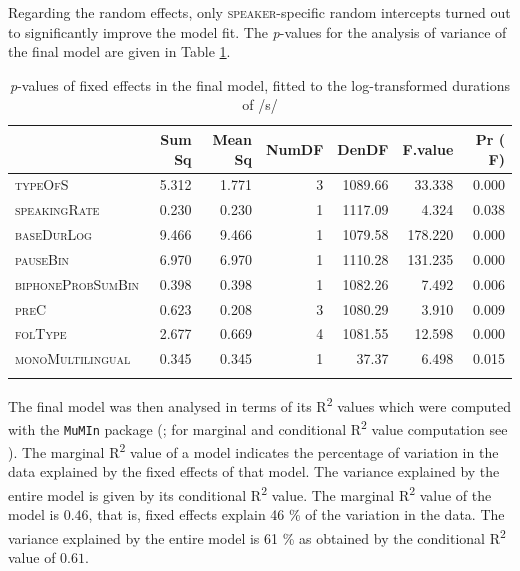 Regarding the random effects, only \textsc{speaker}-specific random intercepts turned out to significantly improve the model fit. The \textit{p}-values for the analysis of variance of the final model are given in Table \ref{tab:4.4}.

\begin{table}\fontsize{10}{11}
\caption{\textit{p}-values of fixed effects in the final model, fitted to the log-transformed durations of /s/}
\label{tab:4.4}
\centering
\begin{tabular}{lrrrrrr} 
\lsptoprule
~                 & Sum Sq & Mean Sq & NumDF & DenDF   & F.value & Pr ( F)  \\ 
\midrule
\textsc{typeOfS}           & 5.312  & 1.771   & 3     & 1089.66 & 33.338  & 0.000    \\
\textsc{speakingRate}      & 0.230  & 0.230   & 1     & 1117.09 & 4.324   & 0.038    \\
\textsc{baseDurLog}        & 9.466  & 9.466   & 1     & 1079.58 & 178.220 & 0.000    \\
\textsc{pauseBin}          & 6.970  & 6.970   & 1     & 1110.28 & 131.235 & 0.000    \\
\textsc{biphoneProbSumBin} & 0.398  & 0.398   & 1     & 1082.26 & 7.492   & 0.006    \\
\textsc{preC}              & 0.623  & 0.208   & 3     & 1080.29 & 3.910   & 0.009    \\
\textsc{folType}           & 2.677  & 0.669   & 4     & 1081.55 & 12.598  & 0.000    \\
\textsc{monoMultilingual}  & 0.345  & 0.345   & 1     & 37.37   & 6.498   & 0.015    \\
\lspbottomrule
\end{tabular}
\end{table}

The final model was then analysed in terms of its R\textsuperscript{2} values which were computed with the \texttt{MuMIn} package (\cite{Barton2020}; for marginal and conditional R\textsuperscript{2} value computation see \cite{Nakagawa2017}). The marginal R\textsuperscript{2} value of a model indicates the percentage of variation in the data explained by the fixed effects of that model. The variance explained by the entire model is given by its conditional R\textsuperscript{2} value. The marginal R\textsuperscript{2} value of the model is $0.46$, that is, fixed effects explain 46 \% of the variation in the data. The variance explained by the entire model is 61 \% as obtained by the conditional R\textsuperscript{2} value of $0.61$.

